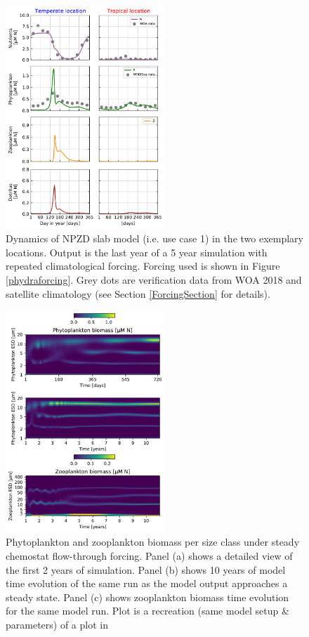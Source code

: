 \documentclass[template.tex]{subfiles}
\begin{document}
\begin{figure}[t]
\includegraphics[width=6cm]{Figures/firstdraft_plots/02_NPZDslab.pdf}
\caption{Dynamics of NPZD slab model (i.e. use case 1) in the two exemplary locations. Output is the last year of a 5 year simulation with repeated climatological forcing. Forcing used is shown in Figure \ref{phydraforcing}. Grey dots are verification data from WOA 2018 and satellite climatology (see Section \ref{ForcingSection} for details).}
\label{Figure:NPZDslab_results}
\end{figure}

\begin{figure}[t]
\includegraphics[width=6cm]{Figures/firstdraft_plots/03_chemostat.pdf}
\caption{Phytoplankton and zooplankton biomass per size class under steady chemostat flow-through forcing. Panel (a) shows a detailed view of the first 2 years of simulation. Panel (b) shows 10 years of model time evolution of the same run as the model output approaches a steady state. Panel (c) shows zooplankton biomass time evolution for the same model run. Plot is a recreation (same model setup \& parameters) of a plot in \citet{Banas2011b}}
\label{Figure:chemostat_plot}
\end{figure}
\end{document}
